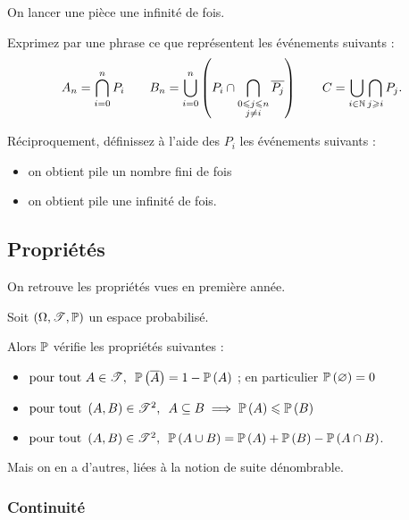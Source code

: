 \begin{exo}
On lancer une pièce une infinité de fois.

Exprimez par une phrase ce que représentent les événements suivants : \[A_n=\bigcap_{i=0}^nP_i\qquad B_n=\bigcup_{i=0}^n\left(P_i\cap\bigcap_{\substack{0\leqslant j\leqslant n \\ j\not=i}}\overline{P_j}\right)\qquad C=\bigcup_{i\in\mathbb{N}}\bigcap_{j\geqslant i}P_j.\]

Réciproquement, définissez à l'aide des \(P_i\) les événements suivants :

\begin{itemize}
    \item on obtient pile un nombre fini de fois \\
    \item on obtient pile une infinité de fois.
\end{itemize}
\end{exo}

\subsection{Propriétés}

On retrouve les propriétés vues en première année.

\begin{prop}
Soit \(\anneau{\Omega}[\fami{T}][\prem]\) un espace probabilisé.

Alors \(\mathbb{P}\) vérifie les propriétés suivantes :

\begin{itemize}
    \item \(\quantifs{\tpt A\in\fami{T}}\proba{\overline{A}}=1-\proba{A}\) ; en particulier \(\mathbb{P}\left(\varnothing\right)=0\) \\
    \item \(\quantifs{\tpt\paren{A,B}\in\fami{T}^2}A\subset B\imp\proba{A}\leq\proba{B}\) \\
    \item \(\quantifs{\tpt\paren{A,B}\in\fami{T}^2}\proba{A\union B}=\proba{A}+\proba{B}-\proba{A\inter B}\).
\end{itemize}
\end{prop}

Mais on en a d'autres, liées à la notion de suite dénombrable.

\subsubsection{Continuité}

